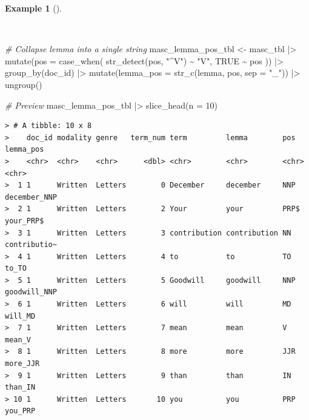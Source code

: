\documentclass[
  letterpaper,
  DIV=11,
  numbers=noendperiod]{scrreport}
\newenvironment{Shaded}{\begin{snugshade}}{\end{snugshade}}
\newcommand{\AttributeTok}[1]{\textcolor[rgb]{0.00,0.00,0.00}{#1}}
\newcommand{\CommentTok}[1]{\textcolor[rgb]{0.00,0.00,0.00}{\textit{#1}}}
\newcommand{\ConstantTok}[1]{\textcolor[rgb]{0.00,0.00,0.00}{#1}}
\newcommand{\DecValTok}[1]{\textcolor[rgb]{0.00,0.00,0.00}{#1}}
\newcommand{\FunctionTok}[1]{\textcolor[rgb]{0.00,0.00,0.00}{#1}}
\newcommand{\NormalTok}[1]{\textcolor[rgb]{0.00,0.00,0.00}{#1}}
\newcommand{\OtherTok}[1]{\textcolor[rgb]{0.00,0.00,0.00}{#1}}
\newcommand{\SpecialCharTok}[1]{\textcolor[rgb]{0.00,0.00,0.00}{#1}}
\newcommand{\StringTok}[1]{\textcolor[rgb]{0.00,0.00,0.00}{#1}}
\theoremstyle{definition}
\newtheorem{example}{Example}[chapter]
\theoremstyle{remark}
\begin{document}
\begin{example}[]\protect\hypertarget{exm-eda-masc-lemma-pos}{}\label{exm-eda-masc-lemma-pos}

~

\begin{Shaded}
\begin{Highlighting}[]
\CommentTok{\# Collapse lemma into a single string}
\NormalTok{masc\_lemma\_pos\_tbl }\OtherTok{\textless{}{-}} 
\NormalTok{  masc\_tbl }\SpecialCharTok{|\textgreater{}} 
  \FunctionTok{mutate}\NormalTok{(}\AttributeTok{pos =} \FunctionTok{case\_when}\NormalTok{(}
    \FunctionTok{str\_detect}\NormalTok{(pos, }\StringTok{"\^{}V"}\NormalTok{) }\SpecialCharTok{\textasciitilde{}} \StringTok{"V"}\NormalTok{,}
    \ConstantTok{TRUE} \SpecialCharTok{\textasciitilde{}}\NormalTok{ pos}
\NormalTok{  )) }\SpecialCharTok{|\textgreater{}} 
  \FunctionTok{group\_by}\NormalTok{(doc\_id) }\SpecialCharTok{|\textgreater{}} 
  \FunctionTok{mutate}\NormalTok{(}\AttributeTok{lemma\_pos =} \FunctionTok{str\_c}\NormalTok{(lemma, pos, }\AttributeTok{sep =} \StringTok{"\_"}\NormalTok{)) }\SpecialCharTok{|\textgreater{}}
  \FunctionTok{ungroup}\NormalTok{()}

\CommentTok{\# Preview}
\NormalTok{masc\_lemma\_pos\_tbl }\SpecialCharTok{|\textgreater{}} 
  \FunctionTok{slice\_head}\NormalTok{(}\AttributeTok{n =} \DecValTok{10}\NormalTok{)}
\end{Highlighting}
\end{Shaded}

\begin{verbatim}
> # A tibble: 10 x 8
>    doc_id modality genre   term_num term         lemma        pos   lemma_pos   
>    <chr>  <chr>    <chr>      <dbl> <chr>        <chr>        <chr> <chr>       
>  1 1      Written  Letters        0 December     december     NNP   december_NNP
>  2 1      Written  Letters        2 Your         your         PRP$  your_PRP$   
>  3 1      Written  Letters        3 contribution contribution NN    contributio~
>  4 1      Written  Letters        4 to           to           TO    to_TO       
>  5 1      Written  Letters        5 Goodwill     goodwill     NNP   goodwill_NNP
>  6 1      Written  Letters        6 will         will         MD    will_MD     
>  7 1      Written  Letters        7 mean         mean         V     mean_V      
>  8 1      Written  Letters        8 more         more         JJR   more_JJR    
>  9 1      Written  Letters        9 than         than         IN    than_IN     
> 10 1      Written  Letters       10 you          you          PRP   you_PRP
\end{verbatim}


\end{example}
\end{document}
